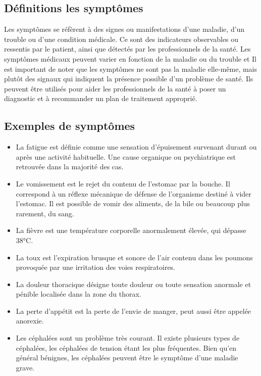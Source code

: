 \subsection{Définitions les symptômes }
Les symptômes se réfèrent à des signes ou manifestations d'une maladie, d'un trouble ou d'une condition médicale. Ce sont des indicateurs observables ou ressentis par le patient, ainsi que détectés par les professionnels de la santé. Les symptômes médicaux peuvent varier en fonction de la maladie ou du trouble et Il est important de noter que les symptômes ne sont pas la maladie elle-même, mais plutôt des signaux qui indiquent la présence possible d'un problème de santé. Ils peuvent être utilisés pour aider les professionnels de la santé à poser un diagnostic et à recommander un plan de traitement approprié.
\subsection{Exemples de symptômes }
\begin{itemize}
\item La fatigue est définie comme une sensation d'épuisement survenant durant ou après une activité habituelle. Une cause organique ou psychiatrique est retrouvée dans la majorité des cas.

\item Le vomissement est le rejet du contenu de l'estomac par la bouche. Il correspond à un réflexe mécanique de défense de l'organisme destiné à vider l'estomac. Il est possible de vomir des aliments, de la bile ou beaucoup plus rarement, du sang.

\item La fièvre est une température corporelle anormalement élevée, qui dépasse 38°C. 

\item La toux est l'expiration brusque et sonore de l'air contenu dans les poumons provoquée par une irritation des voies respiratoires.

\item La douleur thoracique désigne toute douleur ou toute sensation anormale et pénible localisée dans la zone du thorax.

\item La perte d'appétit est la perte de l'envie de manger, peut aussi être appelée anorexie.

\item Les céphalées sont un problème très courant. Il existe plusieurs types de céphalées, les céphalées de tension étant les plus fréquentes. Bien qu’en général bénignes, les céphalées peuvent être le symptôme d’une maladie grave.
\end{itemize}

